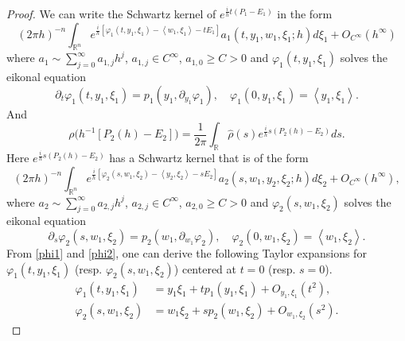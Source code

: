 \documentclass[12pt,reqno]{amsart}
\renewcommand{\phi}{\varphi}
\numberwithin{equation}{section}
\begin{document}
\begin{proof}

We can write the Schwartz kernel of $e^{\frac{i}h t(P_1-E_1)}$ in the form 
\begin{equation}
(2\pi h)^{-n} \int_{\mathbb{R}^n}e^{\frac{i}h [\varphi_1(t, y_1,\xi_1)-\left<w_1, \xi_1\right>-tE_1]} a_1(t, y_1,w_1,\xi_1;h) d\xi_1+ O_{C^\infty}(h^\infty)
\end{equation}
where $a_1\sim \sum_{j=0}^\infty a_{1,j} h^j$, $a_{1,j}\in C^\infty$, $a_{1,0}\geq C>0$ and $\varphi_1(t, y_1,\xi_1)$ solves the eikonal equation
\begin{equation}\label{phi1}
\partial_t \varphi_1(t, y_1,\xi_1)=p_1(y_1, \partial_{y_1} \phi_1), \quad \varphi_1(0, y_1, \xi_1)=\left<y_1,\xi_1 \right>.
\end{equation}
And
\begin{equation}
\rho\big(h^{-1}[P_2(h)-E_2]\big)=\frac{1}{2\pi}\int_{\mathbb{R}}\hat{\rho}(s) e^{\frac{i}h s(P_2(h)-E_2)} ds.
\end{equation}
Here $e^{\frac{i}h s(P_2(h)-E_2)}$ has a Schwartz kernel that is of the form
\begin{equation}
(2\pi h)^{-n} \int_{\mathbb{R}^n}e^{\frac{i}h [\varphi_2(s, w_1,\xi_2)-\left<y_2, \xi_2\right>-sE_2]} a_2(s, w_1,y_2,\xi_2;h) d\xi_2+ O_{C^\infty}(h^\infty),
\end{equation}
where $a_2\sim \sum_{j=0}^\infty a_{2,j} h^j$, $a_{2,j}\in C^\infty$, $a_{2,0}\geq C>0$ and $\varphi_2(s,w_1,\xi_2)$ solves the eikonal equation
\begin{equation}\label{phi2}
\partial_s \varphi_2(s, w_1, \xi_2)=p_2(w_1, \partial_{w_1} \phi_2), \quad \varphi_2(0, w_1, \xi_2)=\left<w_1,\xi_2 \right>.
\end{equation}
From \eqref{phi1} and \eqref{phi2}, one can derive the following Taylor expansions for $\varphi_1(t, y_1,\xi_1)$ (resp. $\varphi_2(s, w_1,\xi_2)$) centered at $t=0$ (resp. $s=0$).
\begin{align}
\varphi_1(t, y_1,\xi_1)&=y_1\xi_1+ tp_1(y_1,\xi_1)+O_{y_1,\xi_1}(t^2), \\
\varphi_2(s, w_1,\xi_2)&=w_1\xi_2+ sp_2(w_1,\xi_2)+O_{w_1,\xi_2}(s^2).
\end{align}




\end{proof}
\end{document}
